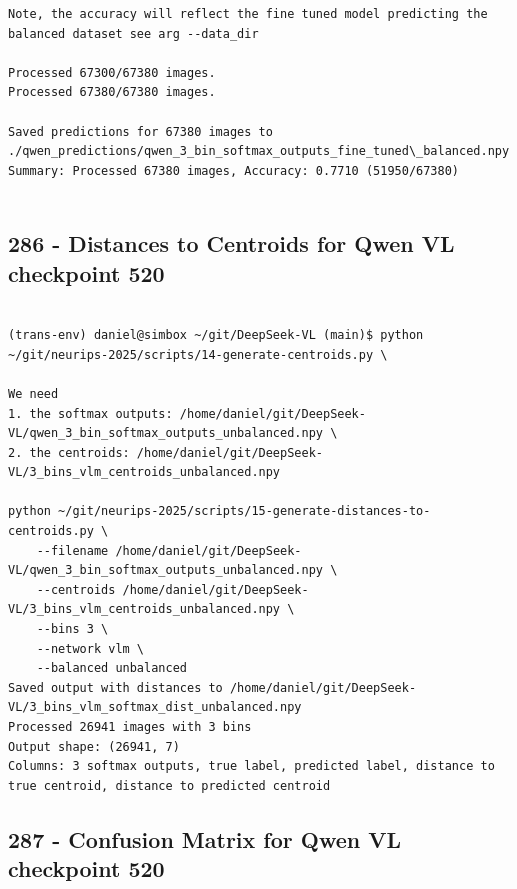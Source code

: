 \begin{verbatim}
Note, the accuracy will reflect the fine tuned model predicting the balanced dataset see arg --data_dir

Processed 67300/67380 images.
Processed 67380/67380 images.

Saved predictions for 67380 images to ./qwen_predictions/qwen_3_bin_softmax_outputs_fine_tuned\_balanced.npy
Summary: Processed 67380 images, Accuracy: 0.7710 (51950/67380)


\end{verbatim}

\subsection{286 - Distances to Centroids for Qwen VL checkpoint 520}
\label{app_res:286}

\begin{verbatim}

(trans-env) daniel@simbox ~/git/DeepSeek-VL (main)$ python ~/git/neurips-2025/scripts/14-generate-centroids.py \

We need 
1. the softmax outputs: /home/daniel/git/DeepSeek-VL/qwen_3_bin_softmax_outputs_unbalanced.npy \
2. the centroids: /home/daniel/git/DeepSeek-VL/3_bins_vlm_centroids_unbalanced.npy

python ~/git/neurips-2025/scripts/15-generate-distances-to-centroids.py \
    --filename /home/daniel/git/DeepSeek-VL/qwen_3_bin_softmax_outputs_unbalanced.npy \
    --centroids /home/daniel/git/DeepSeek-VL/3_bins_vlm_centroids_unbalanced.npy \
    --bins 3 \
    --network vlm \
    --balanced unbalanced
Saved output with distances to /home/daniel/git/DeepSeek-VL/3_bins_vlm_softmax_dist_unbalanced.npy
Processed 26941 images with 3 bins
Output shape: (26941, 7)
Columns: 3 softmax outputs, true label, predicted label, distance to true centroid, distance to predicted centroid

\end{verbatim}

\subsection{287 - Confusion Matrix for Qwen VL checkpoint 520}
\label{app_res:287}

